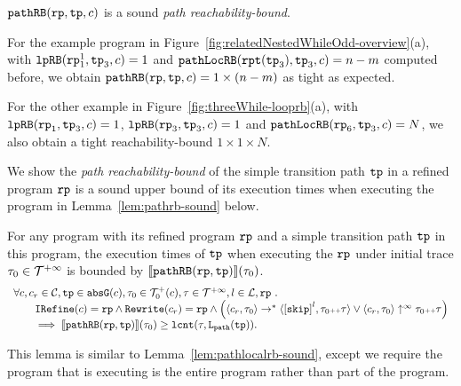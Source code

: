 $\mathtt{pathRB}(\mathtt{rp}, \mathtt{tp}, c)$ is a sound \emph{path reachability-bound}.
%

For the example program in Figure~\ref{fig:relatedNestedWhileOdd-overview}(a),
with $\mathtt{lpRB}(\mathtt{rp}_1^1, \mathtt{tp}_3, c) = 1$ and
$\mathtt{pathLocRB}(\mathtt{rpt}(\mathtt{tp}_3), \mathtt{tp}_3, c) = n - m$ computed before,
we obtain $\mathtt{pathRB}(\mathtt{rp}, \mathtt{tp}, c) = 1 \times (n - m)$ as tight as expected.

For the other example in Figure~\ref{fig:threeWhile-looprb}(a), with $\mathtt{lpRB}(\mathtt{rp}_1, \mathtt{tp}_3, c) = 1$,
$\mathtt{lpRB}(\mathtt{rp}_3, \mathtt{tp}_3, c) = 1$ and
$\mathtt{pathLocRB}(\mathtt{rp}_6, \mathtt{tp}_3, c) = N$,
we also obtain a tight reachability-bound $1 \times 1 \times N$.


We show the \emph{path reachability-bound} of the simple transition path $\mathtt{tp}$ in a refined program $\mathtt{rp}$ is a sound upper bound of its execution times when executing the program in Lemma~\ref{lem:pathrb-sound} below.
\begin{lem}
  \label{lem:pathrb-sound}
  For any program with its refined program $\mathtt{rp}$ and a simple transition path $\mathtt{tp}$ in this program,
  the execution times of $\mathtt{tp}$ when executing the $\mathtt{rp}$ under initial trace $\mathtt{\tau}_0 \in \mathcal{T}^{+\infty}$ is bounded by $\llbracket \mathtt{pathRB}(\mathtt{rp}, \mathtt{tp}) \rrbracket(\mathtt{\tau}_0)$.
  \[
    \begin{array}{l}
    \forall c, c_r \in \cdom, \tpath \in \absG(c), \trace_0 \in \ftdom_0(c), \trace \in \tdom, l \in \ldom, \rprog \st 
    \\ \qquad
    \kw{IRefine}(c) = \rprog
    \land 
    \algrewrite(c_r) = \rprog
    \land
    \Big(
      \config{c_r, \trace_0} \rightarrow^* \config{\clabel{\eskip}^{l}, \trace_0 \tracecat \trace}
      \lor \config{c_r, \trace_0} \uparrow^{\infty} \trace_0 \tracecat \trace 
      \Big)
  \\ \qquad
    \implies
    \econfig{\inoutB(\rprog, \tpath)}(\trace_0) \geq \lcounter(\trace, \pathl(\tpath)).
    \end{array}
  \]  
\end{lem}
This lemma is similar to Lemma~\ref{lem:pathlocalrb-sound}, except we require the program that is executing is the entire program rather than part of the program.